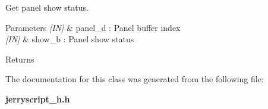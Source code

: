 Get panel show status. 


\begin{DoxyCode}{0}
\end{DoxyCode}



\begin{DoxyParams}{Parameters}
{\em \mbox{[}\+I\+N\mbox{]}} & panel\+\_\+d \+: Panel buffer index \\
\hline
{\em \mbox{[}\+I\+N\mbox{]}} & show\+\_\+b \+: Panel show status \\
\hline
\end{DoxyParams}
\begin{DoxyReturn}{Returns}

\end{DoxyReturn}


The documentation for this class was generated from the following file\+:\begin{DoxyCompactItemize}
\item 
\textbf{ jerryscript\+\_\+h.\+h}\end{DoxyCompactItemize}
